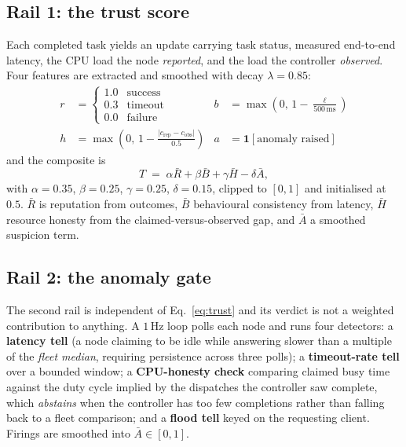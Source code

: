\documentclass[10pt,twocolumn,letterpaper]{article}
\newcommand{\Tscore}{T}
\newcommand{\Agate}{\bar{A}}
\begin{document}
\subsection{Rail 1: the trust score}
Each completed task yields an update carrying task status, measured end-to-end
latency, the CPU load the node \emph{reported}, and the load the controller
\emph{observed}. Four features are extracted and smoothed with decay
$\lambda = 0.85$:
\begin{align*}
  r &= \begin{cases}1.0 & \text{success}\\ 0.3 & \text{timeout}\\ 0.0 & \text{failure}\end{cases}
  &
  b &= \max\!\left(0,\, 1 - \tfrac{\ell}{500\,\mathrm{ms}}\right)\\[2pt]
  h &= \max\!\left(0,\, 1 - \tfrac{\lvert c_{\mathrm{rep}} - c_{\mathrm{obs}}\rvert}{0.5}\right)
  &
  a &= \mathbf{1}[\text{anomaly raised}]
\end{align*}
and the composite is
\begin{equation}
  \Tscore \;=\; \alpha\bar{R} + \beta\bar{B} + \gamma\bar{H} - \delta\Agate,
  \label{eq:trust}
\end{equation}
with $\alpha{=}0.35$, $\beta{=}0.25$, $\gamma{=}0.25$, $\delta{=}0.15$, clipped
to $[0,1]$ and initialised at $0.5$. $\bar{R}$ is reputation from outcomes,
$\bar{B}$ behavioural consistency from latency, $\bar{H}$ resource honesty from
the claimed-versus-observed gap, and $\Agate$ a smoothed suspicion term.

\subsection{Rail 2: the anomaly gate}
The second rail is independent of Eq.~\ref{eq:trust} and its verdict is not a
weighted contribution to anything. A $1$\,Hz loop polls each node and runs four
detectors: a \textbf{latency tell} (a node claiming to be idle while answering
slower than a multiple of the \emph{fleet median}, requiring persistence across
three polls); a \textbf{timeout-rate tell} over a bounded window; a
\textbf{CPU-honesty check} comparing claimed busy time against the duty cycle
implied by the dispatches the controller saw complete, which \emph{abstains}
when the controller has too few completions rather than falling back to a fleet
comparison; and a \textbf{flood tell} keyed on the requesting client. Firings
are smoothed into $\Agate \in [0,1]$.
\end{document}
